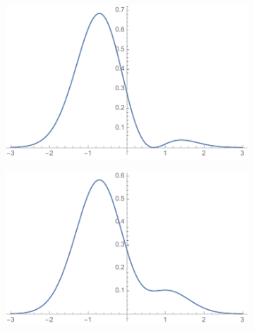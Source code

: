 \begin{enumerate}
\begin{figure}
    \centering
    \begin{subfigure}[t]{0.4\textwidth}
        \centering
        \includegraphics[width=\linewidth]{Pictures/FigPsi4.pdf}
        \caption{} \label{fig:timingA}
    \end{subfigure}
    \hfill
    \begin{subfigure}[t]{0.4\textwidth}
        \centering
        \includegraphics[width=\linewidth]{Pictures/FigPsi3.pdf} 
        \caption{} 
        \label{fig:timingB}
    \end{subfigure}
  


\end{figure}
\end{enumerate}
